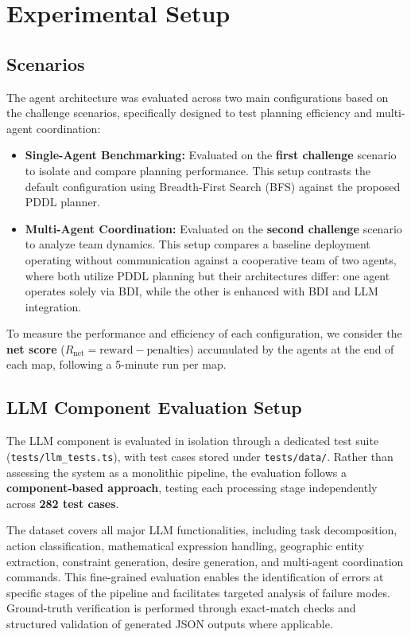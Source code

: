 \section{Experimental Setup}\label{sec:setup}

\subsection{Scenarios}
The agent architecture was evaluated across two main configurations based on the challenge scenarios, specifically designed to test planning efficiency and multi-agent coordination:

\begin{itemize}
    \item \textbf{Single-Agent Benchmarking:} Evaluated on the \textbf{first challenge} scenario to isolate and compare planning performance. This setup contrasts the default configuration using Breadth-First Search (BFS) against the proposed PDDL planner. 
    \item \textbf{Multi-Agent Coordination:} Evaluated on the \textbf{second challenge} scenario to analyze team dynamics. This setup compares a baseline deployment operating without communication against a cooperative team of two agents, where both utilize PDDL planning but their architectures differ: one agent operates solely via BDI, while the other is enhanced with BDI and LLM integration.
\end{itemize}

To measure the performance and efficiency of each configuration, we consider the \textbf{net score} ($R_{\text{net}} = \text{reward} - \text{penalties}$) accumulated by the agents at the end of each map, following a 5-minute run per map.

\subsection{LLM Component Evaluation Setup}
The LLM component is evaluated in isolation through a dedicated test suite \\ (\texttt{tests/llm\_tests.ts}), with test cases stored under \texttt{tests/data/}. Rather than assessing the system as a monolithic pipeline, the evaluation follows a \textbf{component-based approach}, testing each processing stage independently across \textbf{282 test cases}.

The dataset covers all major LLM functionalities, including task decomposition, action classification, mathematical expression handling, geographic entity extraction, constraint generation, desire generation, and multi-agent coordination commands. This fine-grained evaluation enables the identification of errors at specific stages of the pipeline and facilitates targeted analysis of failure modes. Ground-truth verification is performed through exact-match checks and structured validation of generated JSON outputs where applicable.
